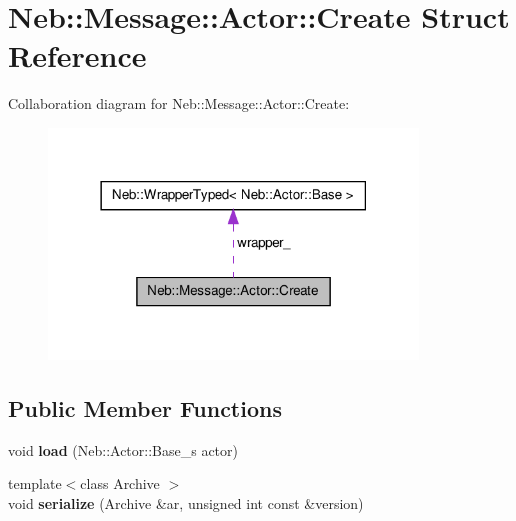 \hypertarget{structNeb_1_1Message_1_1Actor_1_1Create}{\section{\-Neb\-:\-:\-Message\-:\-:\-Actor\-:\-:\-Create \-Struct \-Reference}
\label{structNeb_1_1Message_1_1Actor_1_1Create}
}


\-Collaboration diagram for \-Neb\-:\-:\-Message\-:\-:\-Actor\-:\-:\-Create\-:\nopagebreak
\begin{figure}[H]
\begin{center}
\leavevmode
\includegraphics[width=278pt]{structNeb_1_1Message_1_1Actor_1_1Create__coll__graph}
\end{center}
\end{figure}
\subsection*{\-Public \-Member \-Functions}
\begin{DoxyCompactItemize}
\item 
\hypertarget{structNeb_1_1Message_1_1Actor_1_1Create_a2dd3e4b553c384bf3992f8206e04a779}{void {\bfseries load} (\-Neb\-::\-Actor\-::\-Base\-\_\-s actor)}\label{structNeb_1_1Message_1_1Actor_1_1Create_a2dd3e4b553c384bf3992f8206e04a779}

\item 
\hypertarget{structNeb_1_1Message_1_1Actor_1_1Create_a4805dfe7cf6d556732278330dd7f7c44}{{\footnotesize template$<$class Archive $>$ }\\void {\bfseries serialize} (\-Archive \&ar, unsigned int const \&version)}\label{structNeb_1_1Message_1_1Actor_1_1Create_a4805dfe7cf6d556732278330dd7f7c44}

\end{DoxyCompactItemize}
